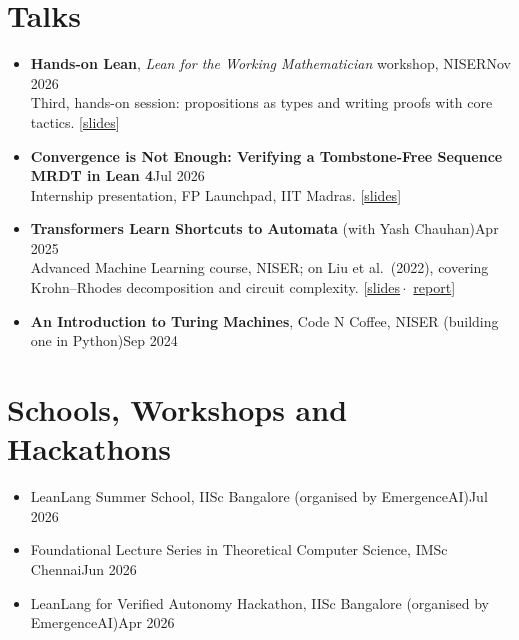 \documentclass[11pt,a4paper]{article}
\newcommand{\cvdated}[2]{#1\hfill{\color{muted}#2}}
\newcommand{\links}[1]{{\small[#1]}}
\begin{document}
\section{Talks}
\begin{itemize}[leftmargin=1.1em]
  \item \cvdated{\textbf{Hands-on Lean}, \emph{Lean for the Working Mathematician} workshop, NISER}{Nov 2026}\\
        Third, hands-on session: propositions as types and writing proofs with core tactics.
        \links{\href{https://github.com/Methaphur/NISER-Lean-Workshop/blob/main/Slides/Lean-Workshop-S3.pdf}{slides}}
  \item \cvdated{\textbf{Convergence is Not Enough: Verifying a Tombstone-Free Sequence MRDT in Lean 4}}{Jul 2026}\\
        Internship presentation, FP Launchpad, IIT Madras.
        \links{\href{https://methaphur.github.io/talks/RGA-Talk.pdf}{slides}}
  \item \cvdated{\textbf{Transformers Learn Shortcuts to Automata} (with Yash Chauhan)}{Apr 2025}\\
        Advanced Machine Learning course, NISER; on Liu et al.\ (2022), covering Krohn--Rhodes
        decomposition and circuit complexity.
        \links{\href{https://methaphur.github.io/talks/transformers-shortcuts-to-automata-slides.pdf}{slides}\,$\cdot$\,%
        \href{https://methaphur.github.io/talks/transformers-shortcuts-to-automata-report.pdf}{report}}
  \item \cvdated{\textbf{An Introduction to Turing Machines}, Code N Coffee, NISER (building one in Python)}{Sep 2024}
\end{itemize}

\section{Schools, Workshops and Hackathons}
\begin{itemize}[leftmargin=1.1em]
  \item \cvdated{LeanLang Summer School, IISc Bangalore (organised by EmergenceAI)}{Jul 2026}
  \item \cvdated{Foundational Lecture Series in Theoretical Computer Science, IMSc Chennai}{Jun 2026}
  \item \cvdated{LeanLang for Verified Autonomy Hackathon, IISc Bangalore (organised by EmergenceAI)}{Apr 2026}
\end{itemize}
\end{document}
